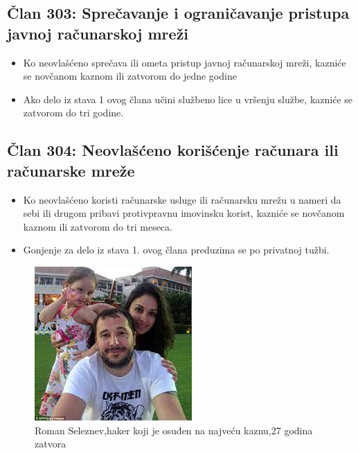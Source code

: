 \documentclass[a4paper]{article}
\begin{document}
\subsection{Član 303: Sprečavanje i ograničavanje pristupa javnoj računarskoj mreži}
\begin{itemize}
	\item Ko neovlašćeno sprečava ili ometa pristup javnoj računarskoj mreži, kazniće se novčanom kaznom ili zatvorom do jedne godine
	\item Ako delo iz stava 1 ovog člana učini službeno lice u vršenju službe, kazniće se zatvorom do tri godine.
\end{itemize}
\subsection{Član 304: Neovlašćeno korišćenje računara ili računarske mreže}
\begin{itemize}
	\item Ko neovlašćeno koristi računarske usluge ili računarsku mrežu u nameri da sebi ili drugom pribavi protivpravnu imovinsku korist, kazniće se novčanom kaznom ili zatvorom do tri meseca.
	\item Gonjenje za delo iz stava 1. ovog člana preduzima se po privatnoj tužbi.
\end{itemize}
\begin{figure}[h!]
	\begin{center}
		\includegraphics[scale=0.30]{roman.jpeg}
	\end{center}
	\caption{Roman Seleznev,haker koji je osuđen na najveću kaznu,27 godina zatvora}
	\label{fig:roman}
\end{figure}
\newpage









 
\end{document}
